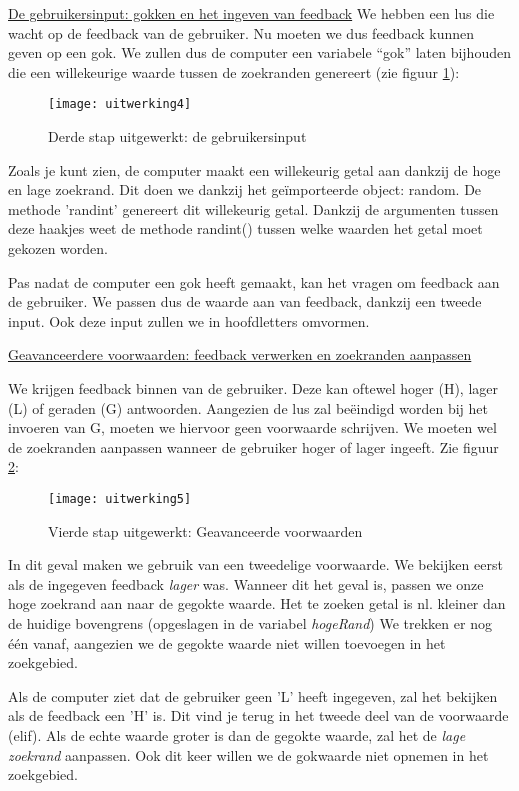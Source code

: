 \underline{De gebruikersinput: gokken en het ingeven van feedback}
We hebben een lus die wacht op de feedback van de gebruiker. Nu moeten we dus feedback kunnen geven op een gok. We zullen dus de computer een variabele “gok” laten bijhouden die een willekeurige waarde tussen de zoekranden genereert (zie figuur \ref{fig:uitwerking4}):

\begin{figure}
    \texttt{[image: uitwerking4]}
    \caption{Derde stap uitgewerkt: de gebruikersinput}
    \label{fig:uitwerking4}
\end{figure}

Zoals je kunt zien, de computer maakt een willekeurig getal aan dankzij de hoge en lage zoekrand. Dit doen we dankzij het geïmporteerde object: random. De methode 'randint' genereert dit willekeurig getal. Dankzij de argumenten tussen deze haakjes weet de methode randint() tussen welke waarden het getal moet gekozen worden.

Pas nadat de computer een gok heeft gemaakt, kan het vragen om feedback aan de gebruiker. We passen dus de waarde aan van feedback, dankzij een tweede input. Ook deze input zullen we in hoofdletters omvormen.

\underline{Geavanceerdere voorwaarden: feedback verwerken en zoekranden aanpassen}

We krijgen feedback binnen van de gebruiker. Deze kan oftewel hoger (H), lager (L) of geraden (G) antwoorden. Aangezien de lus zal beëindigd worden bij het invoeren van G, moeten we hiervoor geen voorwaarde schrijven. We moeten wel de zoekranden aanpassen wanneer de gebruiker hoger of lager ingeeft. Zie figuur \ref{fig:uitwerking5}:

\begin{figure}
    \texttt{[image: uitwerking5]}
    \caption{Vierde stap uitgewerkt: Geavanceerde voorwaarden}
    \label{fig:uitwerking5}
\end{figure}

In dit geval maken we gebruik van een tweedelige voorwaarde. We bekijken eerst als de ingegeven feedback \emph{lager} was. Wanneer dit het geval is, passen we onze hoge zoekrand aan naar de gegokte waarde. Het te zoeken getal is nl. kleiner dan de huidige bovengrens (opgeslagen in de variabel \emph{hogeRand})
We trekken er nog één vanaf, aangezien we de gegokte waarde niet willen toevoegen in het zoekgebied.

Als de computer ziet dat de gebruiker geen 'L' heeft ingegeven, zal het bekijken als de feedback een 'H' is. Dit vind je terug in het tweede deel van de voorwaarde (elif). Als de echte waarde groter is dan de gegokte waarde, zal het de \emph{lage zoekrand} aanpassen. Ook dit keer willen we de gokwaarde niet opnemen in het zoekgebied.

